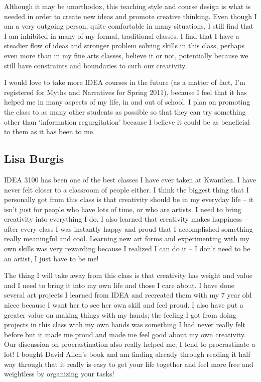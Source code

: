 \documentclass[letterpaper,10pt,headsepline]{scrreprt}
\begin{document}
Although it may be unorthodox, this teaching style and course design is what is needed in order to create new ideas and promote creative thinking. Even though I am a very outgoing person, quite comfortable in many situations, I still find that I am inhibited in many of my formal, traditional classes. I find that I have a steadier flow of ideas and stronger problem solving skills in this class, perhaps even more than in my fine arts classes, believe it or not, potentially because we still have constraints and boundaries to curb our creativity.

I would love to take more IDEA courses in the future (as a matter of fact, I’m registered for Myths and Narratives for Spring 2011), because I feel that it has helped me in many aspects of my life, in and out of school. I plan on promoting the class to as many other students as possible so that they can try something other than ‘information regurgitation’ because I believe it could be as beneficial to them as it has been to me.

\subsection{Lisa Burgis}

IDEA 3100 has been one of the best classes I have ever taken at Kwantlen. I have never felt closer to a classroom of people either. I think the biggest thing that I personally got from this class is that creativity should be in my everyday life -- it isn't just for people who have lots of time, or who are artists. I need to bring creativity into everything I do. I also learned that creativity makes happiness -- after every class I was instantly happy and proud that I accomplished something really meaningful and cool. Learning new art forms and experimenting with my own skills was very rewarding because I realized I can do it -- I don't need to be an artist, I just have to be me!

The thing I will take away from this class is that creativity has weight and value and I need to bring it into my own life and those I care about. I have done several art projects I learned from IDEA and recreated them with my 7 year old niece because I want her to see her own skill and feel proud. I also have put a greater value on making things with my hands; the feeling I got from doing projects in this class with my own hands was something I had never really felt before but it made me proud and made me feel good about my own creativity. Our discussion on procrastination also really helped me; I tend to procrastinate a lot! I bought David Allen's book and am finding already through reading it half way through that it really is easy to get your life together and feel more free and weightless by organizing your tasks!
\end{document}
